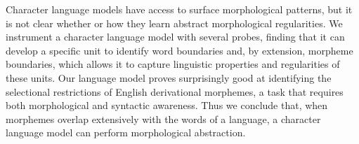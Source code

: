 Character language models have access to surface morphological patterns, but it is not clear whether or how they learn abstract morphological regularities. We instrument a character language model with several probes, finding that it can develop a specific unit to identify word boundaries and, by extension, morpheme boundaries, which allows it to capture linguistic properties and regularities of these units. Our language model proves surprisingly good at identifying the selectional restrictions of English derivational morphemes, a task that requires both morphological and syntactic awareness. Thus we conclude that, when morphemes overlap extensively with the words of a language, a character language model can perform morphological abstraction.
